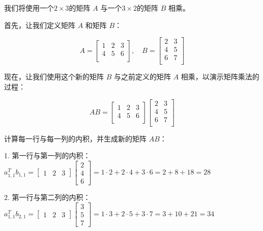 \begin{exercise}
    我们将使用一个$2\times 3$的矩阵 $A$ 与一个$3\times 2$的矩阵 $B$ 相乘。

首先，让我们定义矩阵 $A$ 和矩阵 $B$：

\begin{equation*}
A = \begin{bmatrix}
1 & 2 & 3 \\
4 & 5 & 6 \\
\end{bmatrix}
,\quad
B = \begin{bmatrix}
2 & 3 \\
4 & 5 \\
6 & 7 \\
\end{bmatrix}
\end{equation*}

现在，让我们使用这个新的矩阵 $B$ 与之前定义的矩阵 $A$ 相乘，以演示矩阵乘法的过程：

\begin{equation*}
AB = \begin{bmatrix}
1 & 2 & 3 \\
4 & 5 & 6 \\
\end{bmatrix} \begin{bmatrix}
2 & 3 \\
4 & 5 \\
6 & 7 \\
\end{bmatrix}
\end{equation*}

计算每一行与每一列的内积，并生成新的矩阵 $AB$：

1. 第一行与第一列的内积： $a_{1,1}^T b_{1,1} = \begin{bmatrix} 1 & 2 & 3 \end{bmatrix} \begin{bmatrix} 2 \\ 4 \\ 6 \end{bmatrix} = 1 \cdot 2 + 2 \cdot 4 + 3 \cdot 6 = 2 + 8 + 18 = 28$

2. 第一行与第二列的内积： $a_{1,1}^T b_{2,1} = \begin{bmatrix} 1 & 2 & 3 \end{bmatrix} \begin{bmatrix} 3 \\ 5 \\ 7 \end{bmatrix} = 1 \cdot 3 + 2 \cdot 5 + 3 \cdot 7 = 3 + 10 + 21 = 34$


\end{exercise}
